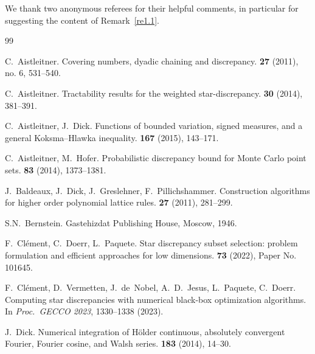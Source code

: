 \documentclass[12pt]{article}
\theoremstyle{definition}
\numberwithin{equation}{section}
\begin{document}
We thank two anonymous referees for their helpful comments, in particular for suggesting the content of Remark~\ref{re1.1}.

\begin{thebibliography}{99}

C.~Aistleitner.
\newblock Covering numbers, dyadic chaining and discrepancy.
 \textbf{27} (2011), no. 6, 531--540.

C.~Aistleitner.
\newblock Tractability results for the weighted star-discrepancy.
 \textbf{30} (2014), 381--391.

C.~Aistleitner, J.~Dick.
\newblock Functions of bounded variation, signed measures, and a general Koksma--Hlawka inequality.
 \textbf{167} (2015), 143--171.



C.~Aistleitner, M.~Hofer.
\newblock Probabilistic discrepancy bound for {M}onte {C}arlo point sets.
 \textbf{83} (2014), 1373--1381.



J.~Baldeaux, J.~Dick, J.~Greslehner, F.~Pillichshammer.
\newblock Construction algorithms for higher order polynomial lattice rules.
 \textbf{27} (2011), 281--299.

S.N.~Bernstein.
\newblock Gastehizdat Publishing House, Moscow, 1946.



F.~Cl\'ement, C.~Doerr, L.~Paquete.
\newblock Star discrepancy subset selection: problem formulation and efficient approaches for low dimensions.
 \textbf{73} (2022), Paper No. 101645.


F.~Cl\'ement, D.~Vermetten, J.~de~Nobel, A.~D.~Jesus, L.~Paquete, C.~Doerr.
\newblock Computing star discrepancies with numerical black-box optimization algorithms.
\newblock In {\em Proc.\ GECCO 2023}, 1330--1338 (2023).

J.~Dick.
\newblock Numerical integration of Hölder continuous, absolutely convergent Fourier, Fourier cosine, and Walsh series.
 \textbf{183} (2014), 14--30.


\end{thebibliography}
\end{document}
